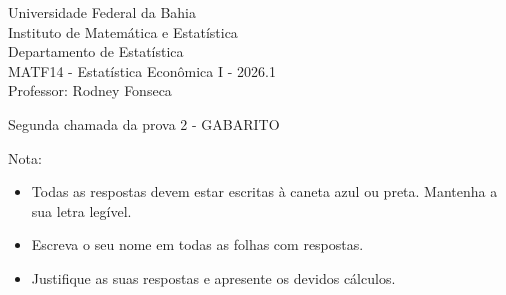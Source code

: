 \documentclass{article}
\date{--/--/----} %
\begin{document}
\begin{flushleft}
	Universidade Federal da Bahia\\
	Instituto de Matemática e Estatística\\
	Departamento de Estatística\\
	MATF14 - Estatística Econômica I - 2026.1\\
	Professor: Rodney Fonseca \\
\end{flushleft}

\begin{center}
	\begin{Large}
		Segunda chamada da prova 2 {\color{blue} - GABARITO} \\
	\end{Large}	
\end{center}

\hspace{2em} Nota: 

\vspace{1em}

\begin{flushleft}
\begin{small}

\begin{itemize}
	\item Todas as respostas devem estar escritas à caneta azul ou preta. Mantenha a sua letra legível.
	\item Escreva o seu nome em todas as folhas com respostas.
	\item Justifique as suas respostas e apresente os devidos cálculos.
\end{itemize}

\end{small}
\end{flushleft}

\vspace{1em}

\end{document}
